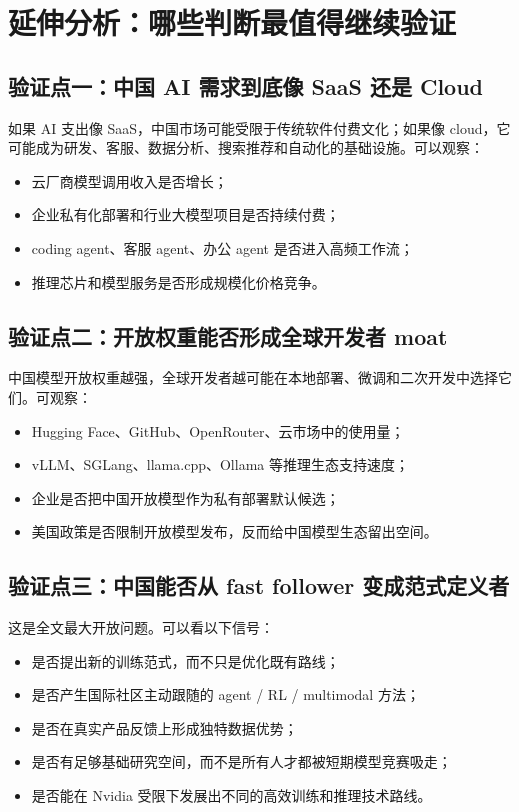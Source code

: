 \section{延伸分析：哪些判断最值得继续验证}

\subsection{验证点一：中国 AI 需求到底像 SaaS 还是 Cloud}

如果 AI 支出像 SaaS，中国市场可能受限于传统软件付费文化；如果像 cloud，它可能成为研发、客服、数据分析、搜索推荐和自动化的基础设施。可以观察：

\begin{itemize}[leftmargin=1.5em]
    \item 云厂商模型调用收入是否增长；
    \item 企业私有化部署和行业大模型项目是否持续付费；
    \item coding agent、客服 agent、办公 agent 是否进入高频工作流；
    \item 推理芯片和模型服务是否形成规模化价格竞争。
\end{itemize}

\subsection{验证点二：开放权重能否形成全球开发者 moat}

中国模型开放权重越强，全球开发者越可能在本地部署、微调和二次开发中选择它们。可观察：

\begin{itemize}[leftmargin=1.5em]
    \item Hugging Face、GitHub、OpenRouter、云市场中的使用量；
    \item vLLM、SGLang、llama.cpp、Ollama 等推理生态支持速度；
    \item 企业是否把中国开放模型作为私有部署默认候选；
    \item 美国政策是否限制开放模型发布，反而给中国模型生态留出空间。
\end{itemize}

\subsection{验证点三：中国能否从 fast follower 变成范式定义者}

这是全文最大开放问题。可以看以下信号：

\begin{itemize}[leftmargin=1.5em]
    \item 是否提出新的训练范式，而不只是优化既有路线；
    \item 是否产生国际社区主动跟随的 agent / RL / multimodal 方法；
    \item 是否在真实产品反馈上形成独特数据优势；
    \item 是否有足够基础研究空间，而不是所有人才都被短期模型竞赛吸走；
    \item 是否能在 Nvidia 受限下发展出不同的高效训练和推理技术路线。
\end{itemize}

